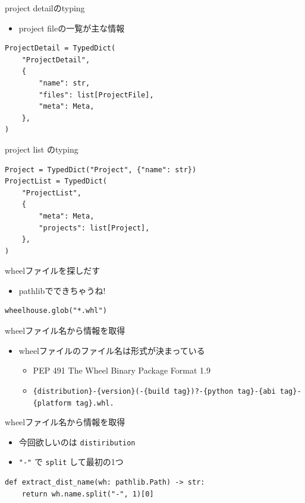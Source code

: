 \documentclass[presentation]{beamer}
\begin{document}
\begin{frame}[label={sec:org349c25a},fragile]{project detailのtyping}
 \begin{itemize}
\item project fileの一覧が主な情報
\end{itemize}

\begin{verbatim}
ProjectDetail = TypedDict(
    "ProjectDetail",
    {
        "name": str,
        "files": list[ProjectFile],
        "meta": Meta,
    },
)

\end{verbatim}
\end{frame}

\begin{frame}[label={sec:orgfe1d9a4},fragile]{project list のtyping}
 \begin{verbatim}
Project = TypedDict("Project", {"name": str})
ProjectList = TypedDict(
    "ProjectList",
    {
        "meta": Meta,
        "projects": list[Project],
    },
)

\end{verbatim}
\end{frame}

\begin{frame}[label={sec:org63cdf53},fragile]{wheelファイルを探しだす}
 \begin{itemize}
\item pathlibでできちゃうね!
\end{itemize}

\begin{verbatim}
wheelhouse.glob("*.whl")
\end{verbatim}
\end{frame}

\begin{frame}[label={sec:org767b0f5},fragile]{wheelファイル名から情報を取得}
 \begin{itemize}
\item wheelファイルのファイル名は形式が決まっている
\begin{itemize}
\item PEP 491 The Wheel Binary Package Format 1.9
\item \texttt{\{distribution\}-\{version\}(-\{build tag\})?-\{python tag\}-\{abi tag\}-\{platform tag\}.whl.}
\end{itemize}
\end{itemize}
\end{frame}

\begin{frame}[label={sec:org9e70857},fragile]{wheelファイル名から情報を取得}
 \begin{itemize}
\item 今回欲しいのは \texttt{distiribution}
\item \texttt{"-"} で \texttt{split} して最初の1つ
\end{itemize}

\begin{verbatim}
def extract_dist_name(wh: pathlib.Path) -> str:
    return wh.name.split("-", 1)[0]
\end{verbatim}
\end{frame}
\end{document}
